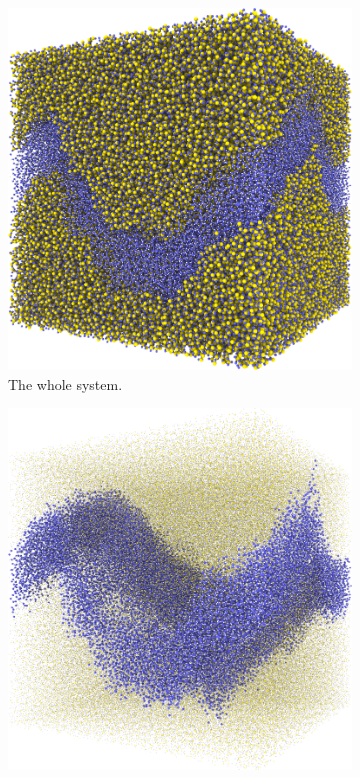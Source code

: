 %
\begin{figure}[!p]%
    \centering%
    \setlength{\myfigwidth}{0.49\textwidth}%
%
    \begin{subfigure}[t]{\myfigwidth}%
        \centering%
        \includegraphics[width=\textwidth]{images/systems/trimmed-rough_fracture05_05}%
        \caption{The whole system.}%
    \end{subfigure}%
    \hfill%
    \begin{subfigure}[t]{\myfigwidth}%
        \centering%
        \includegraphics[width=\textwidth]{images/systems/trimmed-rough_fracture05_04}%

\end{subfigure}
\end{figure}
